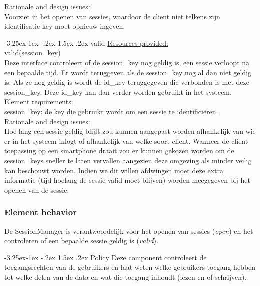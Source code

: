 \documentclass[a4paper,10pt]{article}
\makeatletter
\renewcommand\paragraph{\@startsection{paragraph}{4}{\z@}%
  {-3.25ex\@plus -1ex \@minus -.2ex}%
  {1.5ex \@plus .2ex}%
  {\normalfont\normalsize\bfseries}}
\makeatother
\begin{document}
\underline{Rationale and design issues:}\\
Voorziet in het openen van sessies, waardoor de client niet telkens zijn identificatie key moet opnieuw ingeven.

\paragraph{valid}
\underline{Resources provided:}\\
valid(session\_key)\\
Deze interface controleert of de session\_key nog geldig is, een sessie verloopt na een bepaalde tijd.  Er wordt teruggeven als de session\_key nog al dan niet geldig is.  Als ze nog geldig is wordt de id\_key teruggegeven die verbonden is met deze session\_key.  Deze id\_key kan dan verder worden gebruikt in het systeem.\\

\underline{Element requirements:}\\
session\_key: de key die gebruikt wordt om een sessie te identifici\"{e}ren.\\

\underline{Rationale and design issues:}\\
Hoe lang een sessie geldig blijft zou kunnen aangepast worden afhankelijk van wie er in het systeem inlogt of afhankelijk van welke soort client.  Wanneer de client toepassing op een smartphone draait zou er kunnen gekozen worden om de session\_keys sneller te laten vervallen aangezien deze omgeving als minder veilig kan beschouwt worden.  Indien we dit willen afdwingen moet deze extra informatie (tijd hoelang de sessie valid moet blijven) worden meegegeven bij het openen van de sessie.

\subsubsection*{Element behavior}
De SessionManager is verantwoordelijk voor het openen van sessies (\textit{open}) en het controleren of een bepaalde sessie geldig is (\textit{valid}).

\paragraph{Policy}
Deze component controleert de toegangsrechten van de gebruikers en laat weten welke gebruikers toegang hebben tot welke delen van de data en wat die toegang inhoudt (lezen en of schrijven).
\end{document}
